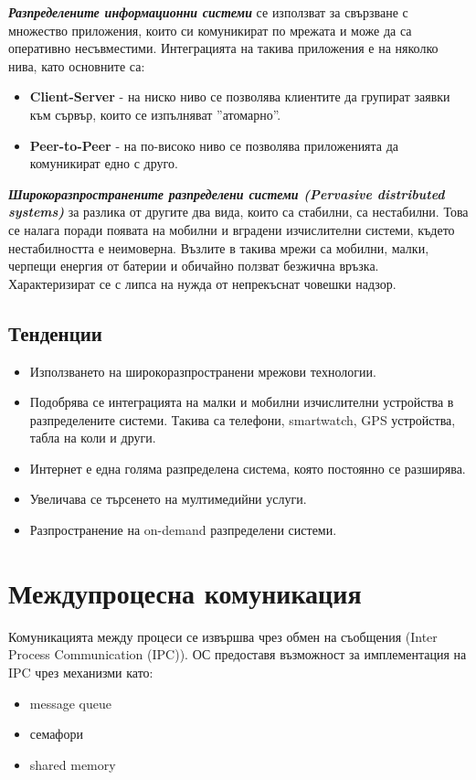 \documentclass[fleqn,12pt]{article}
\begin{document}
\textbf{\textit{Разпределените информационни системи}} се използват за свързване с множество приложения, които си комуникират по мрежата и може да са оперативно несъвместими.
Интеграцията на такива приложения е на няколко нива, като основните са:
\begin{itemize}
    \item \textbf{Client-Server} - на ниско ниво се позволява клиентите да групират заявки към сървър, които се изпълняват ''атомарно''.
    \item \textbf{Peer-to-Peer} - на по-високо ниво се позволява приложенията да комуникират едно с друго.
\end{itemize}

\textbf{\textit{Широкоразпространените разпределени системи (Pervasive distributed systems)}} за разлика от другите два вида, които са стабилни, са нестабилни.
Това се налага поради появата на мобилни и вградени изчислителни системи, където нестабилността е неимоверна.
Възлите в такива мрежи са мобилни, малки, черпещи енергия от батерии и обичайно ползват безжична връзка.
Характеризират се с липса на нужда от непрекъснат човешки надзор.

\subsection{Тенденции}

\begin{itemize}
    \item Използването на широкоразпространени мрежови технологии.
    \item Подобрява се интеграцията на малки и мобилни изчислителни устройства в разпределените системи. Такива са телефони, smartwatch, GPS устройства, табла на коли и други.
    \item Интернет е една голяма разпределена система, която постоянно се разширява.
    \item Увеличава се търсенето на мултимедийни услуги.
    \item Разпространение на on-demand разпределени системи.
\end{itemize}


\section{Междупроцесна комуникация}

Комуникацията между процеси се извършва чрез обмен на съобщения (Inter Process Communication (IPC)). ОС предоставя възможност за имплементация на IPC чрез механизми като:
\begin{itemize}
    \item message queue
    \item семафори
    \item shared memory
\end{itemize}
\end{document}
